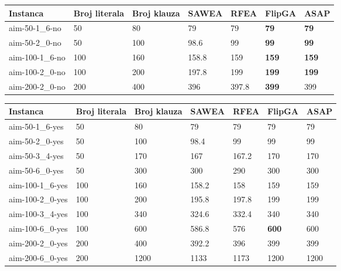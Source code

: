\documentclass{article}
\begin{document}
\begin{table}[h!]
\centering
{}\label{tab:ea_UNSAT}
\begin{tabular}{ |p{3cm}|p{1.6cm}|p{1.6cm}||p{1.6cm}|p{1.6cm}|p{1.6cm}|p{1.6cm}|} \hline
 Instanca & Broj \break literala & Broj \break klauza & SAWEA & RFEA & FlipGA & ASAP \\ \hline
 aim-50-1\_6-no & 50 & 80 & 79 & 79 & \textbf{79} & \textbf{79} \\ \hline
 aim-50-2\_0-no & 50 & 100 & 98.6 &  99 & \textbf{99} & \textbf{99} \\ \hline
 aim-100-1\_6-no & 100 & 160 & 158.8 & 159 & \textbf{159} & \textbf{159} \\ \hline
 aim-100-2\_0-no & 100 & 200 & 197.8 & 199 & \textbf{199} & \textbf{199} \\ \hline
 aim-200-2\_0-no & 200 & 400 & 396 & 397.8 & \textbf{399} & 399 \\ \hline
\end{tabular}
\end{table}

\begin{table}[h!]
\centering
{}\label{tab:ea_SAT} 
\begin{tabular}{ |p{3cm}|p{1.6cm}|p{1.6cm}||p{1.6cm}|p{1.6cm}|p{1.6cm}|p{1.6cm}|} \hline
 Instanca & Broj \break literala & Broj \break klauza & SAWEA & RFEA & FlipGA & ASAP \\ \hline
 aim-50-1\_6-yes & 50 & 80 & 79 & 79 & 79 &  79 \\ \hline
 aim-50-2\_0-yes & 50 & 100 &  98.4 &  99 & 99 & 99 \\ \hline
 aim-50-3\_4-yes & 50 & 170 & 167 & 167.2 & 170 & 170  \\ \hline
 aim-50-6\_0-yes & 50 & 300 &  300 & 290 &  300 &  300 \\ \hline 
 \hline
 aim-100-1\_6-yes & 100 & 160 & 158.2 & 158 &  159 & 159 \\ \hline
 aim-100-2\_0-yes & 100 & 200 & 195.8 &  197.8 & 199 &  199 \\ \hline
 aim-100-3\_4-yes & 100 & 340 & 324.6  & 332.4 & 340 & 340 \\ \hline
 aim-100-6\_0-yes & 100 & 600 &  586.8 & 576 & \textbf{600} & 600 \\ \hline
 \hline
 aim-200-2\_0-yes & 200 & 400 &  392.2 & 396 & 399 & 399 \\ \hline
 aim-200-6\_0-yes & 200 & 1200 & 1133 & 1173 &  1200 & 1200 \\ \hline
\end{tabular} 
\end{table}
\end{document}
